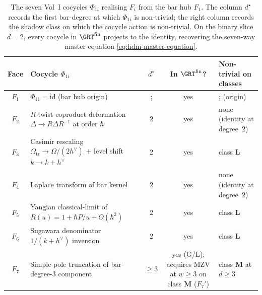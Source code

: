 \begin{table}[htbp]
\centering
\renewcommand{\arraystretch}{1.2}
\begin{tabular}{|c|l|c|c|l|}
\hline
\textbf{Face} & \textbf{Cocycle $\Phi_{1i}$} & $d^\star$
 & \textbf{In $\GRT^{\mathrm{fin}}$?} & \textbf{Non-trivial on classes} \\
\hline\hline
$F_1$ & $\Phi_{11}=\mathrm{id}$ (bar hub origin) &; & yes &; (origin) \\
\hline
$F_2$ & $R$-twist coproduct deformation
 $\Delta\to R\Delta R^{-1}$ at order $\hbar$
 & $2$ & yes & none (identity at degree~$2$) \\
\hline
$F_3$ & Casimir rescaling $\Omega_{\mathrm{tr}}\to\Omega/(2h^\vee)$
 $+$ level shift $k\to k+h^\vee$
 & $2$ & yes & class $\mathbf{L}$ \\
\hline
$F_4$ & Laplace transform of bar kernel
 & $2$ & yes & none (identity at degree~$2$) \\
\hline
$F_5$ & Yangian classical-limit of $R(u)=1+\hbar P/u+O(\hbar^2)$
 & $2$ & yes & class $\mathbf{L}$ \\
\hline
$F_6$ & Sugawara denominator $1/(k+h^\vee)$ inversion
 & $2$ & yes & class $\mathbf{L}$ \\
\hline
$F_7$ & Simple-pole truncation of bar-degree-$3$ component
 & $\geq 3$ & yes (G/L);
 acquires MZV at $w\geq 3$ on class $\mathbf{M}$ ($F_7'$)
 & class $\mathbf{M}$ at $d\geq 3$ \\
\hline
\end{tabular}
\caption{The seven Vol~I cocycles $\Phi_{1i}$ realising $F_i$ from
the bar hub $F_1$. The column $d^\star$ records the first bar-degree
at which $\Phi_{1i}$ is non-trivial; the right column records the
shadow class on which the cocycle action is non-trivial. On the
binary slice $d=2$, every cocycle in $\GRT^{\mathrm{fin}}$ projects
to the identity, recovering the seven-way master equation
\eqref{eq:hdm-master-equation}.}
\label{tab:hdm-cocycle-record}
\end{table}

